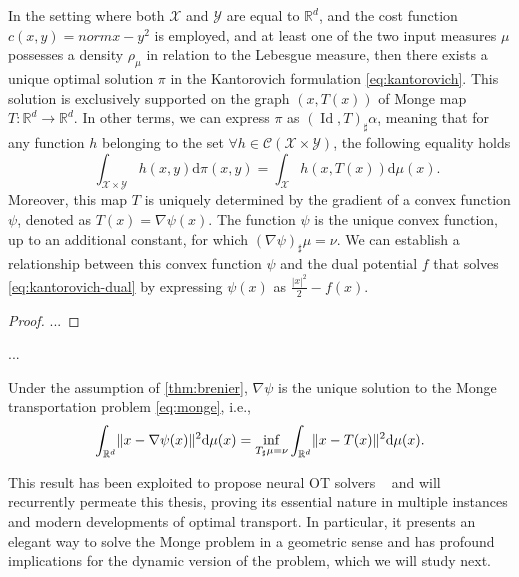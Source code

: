 \begin{theorem} \label{thm:brenier}
	In the setting where both $\mathcal{X}$ and $\mathcal{Y}$ are equal to $\mathbb{R}^d$, and the cost function $c(x, y) = norm{x-y}^2$ is employed, and at least one of the two input measures $\mu$ possesses a density $\rho_\mu$ in relation to the Lebesgue measure, then there exists a unique optimal solution $\pi$ in the Kantorovich formulation \eqref{eq:kantorovich}.
	This solution is exclusively supported on the graph $(x, T(x))$ of Monge map $T: \mathbb{R}^d \rightarrow \mathbb{R}^d$.
	In other terms, we can express $\pi$ as $(\operatorname{Id}, T)_{\sharp} \alpha$, meaning that for any function $h$ belonging to the set $\forall h \in \mathcal{C}(\mathcal{X} \times \mathcal{Y})$, the following equality holds
	$$
	\quad \int_{\mathcal{X} \times \mathcal{Y}} h(x, y) \mathrm{d} \pi(x, y)=\int_{\mathcal{X}} h(x, T(x)) \mathrm{d} \mu(x).
	$$
Moreover, this map $T$ is uniquely determined by the gradient of a convex function $\psi$, denoted as $T(x)=\nabla \psi(x)$. The function $\psi$ is the unique convex function, up to an additional constant, for which $(\nabla \psi)_{\sharp} \mu=\nu$. We can establish a relationship between this convex function $\psi$ and the dual potential $f$ that solves \eqref{eq:kantorovich-dual} by expressing $\psi(x)$ as $\frac{|x|^2}{2}-f(x)$.
\end{theorem}
\begin{proof}
	...
\end{proof}
...
\begin{corollary}
	Under the assumption of \cref{thm:brenier}, $\nabla \psi$ is the unique solution to the Monge transportation problem \eqref{eq:monge}, i.e.,
	\begin{equation}
		\int_{\mathbb{R}^d} \lVert x-\nabla \psi(x)\rVert^2 \mathrm{d}\mu(x) = \inf_{T_\sharp \mu = \nu} \int_{\mathbb{R}^d}\lVert x - T(x)\rVert^2 \mathrm{d}\mu(x).
	\end{equation}
\end{corollary}
This result has been exploited to propose neural OT solvers ~\citep{makkuva2020optimal, korotin2021wasserstein, bunne2022proximal, alvarez2021optimizing, mokrov2021large} and  will recurrently permeate this thesis, proving its essential nature in multiple instances and modern developments of optimal transport.
In particular, it presents an elegant way to solve the Monge problem in a geometric sense and has profound implications for the dynamic version of the problem, which we will study next.


